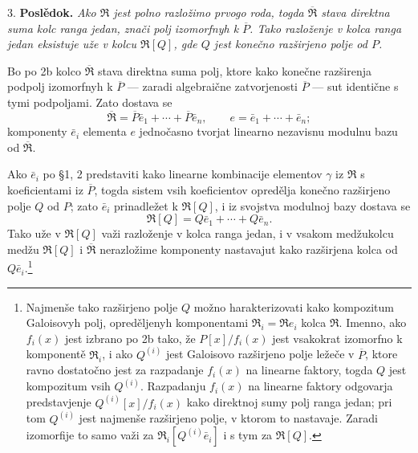 \documentclass[11pt]{article}
\begin{document}
\setcounter{footnote}{22}

3. \textbf{Poslědok.} \emph{Ako $\mathfrak R$ jest polno razložimo prvogo roda, togda $\overline{\mathfrak R}$ stava direktna suma kolc ranga jedan, znači polj izomorfnyh k $\overline P$. Tako razloženje v kolca ranga jedan eksistuje uže v kolcu $\mathfrak R[Q]$, gde $Q$ jest konečno razširjeno polje od $P$.}

Bo po 2b kolco $\overline{\mathfrak R}$ stava direktna suma polj, ktore kako konečne razširenja podpolj izomorfnyh k $\overline P$ --- zaradi algebraične zatvorjenosti $\overline P$ --- sut identične s tymi podpoljami. Zato dostava se
\[
        \overline{\mathfrak R}=\overline P\bar e_1+\cdots+\overline P\bar e_n,
        \qquad e=\bar e_1+\cdots+\bar e_n;
\]
komponenty $\bar e_i$ elementa $e$ jednočasno tvorjat linearno nezavisnu modulnu bazu od $\overline{\mathfrak R}$.

Ako $\bar e_i$ po \S 1, 2 predstaviti kako linearne kombinacije elementov $\gamma$ iz $\mathfrak R$ s koeficientami iz $\overline P$, togda sistem vsih koeficientov opredělja konečno razširjeno polje $Q$ od $P$; zato $\bar e_i$ prinadležet k $\mathfrak R[Q]$, i iz svojstva modulnoj bazy dostava se
\[
        \mathfrak R[Q]=Q\bar e_1+\cdots+Q\bar e_n.
\]
Tako uže v $\mathfrak R[Q]$ važi razloženje v kolca ranga jedan, i v vsakom medžukolcu medžu $\mathfrak R[Q]$ i $\overline{\mathfrak R}$ nerazložime komponenty nastavajut kako razširjena kolca od $Q\bar e_i$.\footnote{Najmenše tako razširjeno polje $Q$ možno harakterizovati kako kompozitum Galoisovyh polj, opreděljenyh komponentami $\mathfrak R_i=\mathfrak R e_i$ kolca $\mathfrak R$. Imenno, ako $f_i(x)$ jest izbrano po 2b tako, že $P[x]/f_i(x)$ jest vsakokrat izomorfno k komponentě $\mathfrak R_i$, i ako $Q^{(i)}$ jest Galoisovo razširjeno polje ležeče v $\overline P$, ktore ravno dostatočno jest za razpadanje $f_i(x)$ na linearne faktory, togda $Q$ jest kompozitum vsih $Q^{(i)}$. Razpadanju $f_i(x)$ na linearne faktory odgovarja predstavjenje $Q^{(i)}[x]/f_i(x)$ kako direktnoj sumy polj ranga jedan; pri tom $Q^{(i)}$ jest najmenše razširjeno polje, v ktorom to nastavaje. Zaradi izomorfije to samo važi za $\mathfrak R_i[Q^{(i)}\bar e_i]$ i s tym za $\mathfrak R[Q]$.}
\end{document}
